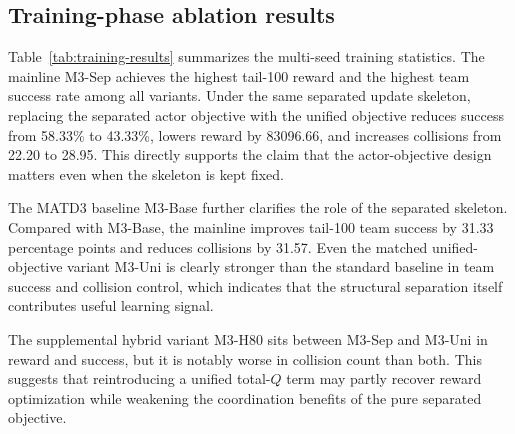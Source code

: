 \documentclass[a4paper,fleqn]{cas-dc}
\begin{document}
\subsection{Training-phase ablation results}

Table~\ref{tab:training-results} summarizes the multi-seed training statistics. The mainline M3-Sep achieves the highest tail-100 reward and the highest team success rate among all variants. Under the same separated update skeleton, replacing the separated actor objective with the unified objective reduces success from 58.33\% to 43.33\%, lowers reward by 83096.66, and increases collisions from 22.20 to 28.95. This directly supports the claim that the actor-objective design matters even when the skeleton is kept fixed.

The MATD3 baseline M3-Base further clarifies the role of the separated skeleton. Compared with M3-Base, the mainline improves tail-100 team success by 31.33 percentage points and reduces collisions by 31.57. Even the matched unified-objective variant M3-Uni is clearly stronger than the standard baseline in team success and collision control, which indicates that the structural separation itself contributes useful learning signal.

The supplemental hybrid variant M3-H80 sits between M3-Sep and M3-Uni in reward and success, but it is notably worse in collision count than both. This suggests that reintroducing a unified total-$Q$ term may partly recover reward optimization while weakening the coordination benefits of the pure separated objective.
\end{document}

